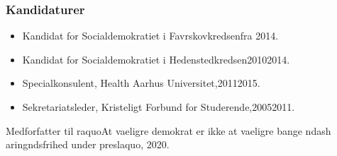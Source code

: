 \documentclass[11pt, a4paper]{awesome-cv}
\begin{document}
\begin{cvletter}
\subsubsection*{Kandidaturer}
\begin{itemize}
\item Kandidat for Socialdemokratiet i Favrskovkredsenfra 2014.
\item Kandidat for Socialdemokratiet i Hedenstedkredsen20102014.
\end{itemize}
\begin{itemize}
\item Specialkonsulent, Health Aarhus Universitet,20112015.
\item Sekretariatsleder, Kristeligt Forbund for Studerende,20052011.
\end{itemize}
Medforfatter til raquoAt vaeligre demokrat er ikke at vaeligre bange ndash aringndsfrihed under preslaquo, 2020.

\end{cvletter}
\end{document}
